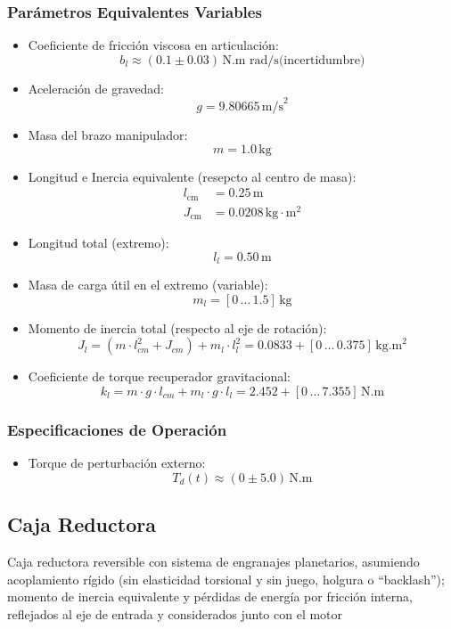 \documentclass[a4paper, 10pt, onecolumn,journal]{ieeeconf}
\begin{document}
\subsubsection{\textbf{Parámetros Equivalentes Variables}}
\begin{itemize}
    \item Coeficiente de fricción viscosa en articulación:
    \[
    b_l \approx (0.1 \pm 0.03) \, \text{N.m rad/s} \text{(incertidumbre)}
    \]
    \item Aceleración de gravedad:
    \[
    g = 9.80665 \, \text{m/s}^2
    \]
    \item Masa del brazo manipulador:
    \[m = 1.0 \, \text{kg}
    \]
    \item Longitud e Inercia equivalente (resepcto al centro de masa):
    \begin{align*}
    l_{\text{cm}} &= 0.25 \, \text{m} \\
    J_{\text{cm}} &= 0.0208 \, \text{kg}\cdot\text{m}^2
    \end{align*}
    \item Longitud total (extremo):
    \[
    l_l = 0.50 \, \text{m}
    \]
    \item Masa de carga útil en el extremo (variable):
    \[
    m_l = [0 \, \ldots \, 1.5] \, \text{kg}
    \]
    \item Momento de inercia total (respecto al eje de rotación): 
    \[
    J_l = (m \cdot l_{cm}^2 + J_{cm}) + m_l \cdot l_l^2 = 0.0833 + [0 \, \ldots \, 0.375] \, \text{kg.m}^2
    \]
    \item Coeficiente de torque recuperador gravitacional: 
    \[
    k_l = m \cdot g \cdot l_{cm} + m_l \cdot g \cdot l_l = 2.452 + [0 \, \ldots \, 7.355] \, \text{N.m}
    \]
\end{itemize}



\subsubsection{\textbf{Especificaciones de Operación}}
\begin{itemize}
    \item Torque de perturbación externo:
    \[T_d(t) \approx (0 \pm 5.0) \, \text{N.m}
    \]
\end{itemize}



\subsection{\textbf{Caja Reductora}}
Caja reductora reversible con sistema de engranajes planetarios, asumiendo acoplamiento rígido (sin elasticidad torsional y sin juego, holgura o ``backlash''); momento de inercia equivalente y pérdidas de energía por fricción interna, reflejados al eje de entrada y considerados junto con el motor
\bigskip
\end{document}
